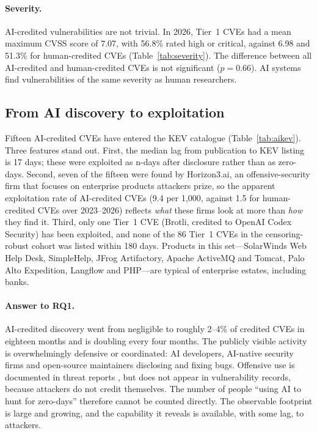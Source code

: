 \paragraph{Severity.} AI-credited vulnerabilities are not trivial. In 2026, Tier~1 CVEs had a mean maximum CVSS score of 7.07, with 56.8\% rated high or critical, against 6.98 and 51.3\% for human-credited CVEs (Table~\ref{tab:severity}). The difference between all AI-credited and human-credited CVEs is not significant ($p=0.66$). AI systems find vulnerabilities of the same severity as human researchers.

\subsection{From AI discovery to exploitation}
Fifteen AI-credited CVEs have entered the KEV catalogue (Table~\ref{tab:aikev}). Three features stand out. First, the median lag from publication to KEV listing is 17 days; these were exploited as n-days after disclosure rather than as zero-days. Second, seven of the fifteen were found by Horizon3.ai, an offensive-security firm that focuses on enterprise products attackers prize, so the apparent exploitation rate of AI-credited CVEs (9.4 per 1,000, against 1.5 for human-credited CVEs over 2023--2026) reflects \emph{what} these firms look at more than \emph{how} they find it. Third, only one Tier~1 CVE (Brotli, credited to OpenAI Codex Security) has been exploited, and none of the 86 Tier~1 CVEs in the censoring-robust cohort was listed within 180 days. Products in this set---SolarWinds Web Help Desk, SimpleHelp, JFrog Artifactory, Apache ActiveMQ and Tomcat, Palo Alto Expedition, Langflow and PHP---are typical of enterprise estates, including banks.

\begin{table}[!htbp]
\centering
\caption{AI-credited CVEs that entered the KEV catalogue.}
\label{tab:aikev}
\scriptsize
\resizebox{\textwidth}{!}{}
\end{table}

\paragraph{Answer to RQ1.} AI-credited discovery went from negligible to roughly 2--4\% of credited CVEs in eighteen months and is doubling every four months. The publicly visible activity is overwhelmingly defensive or coordinated: AI developers, AI-native security firms and open-source maintainers disclosing and fixing bugs. Offensive use is documented in threat reports \citep{microsoft2024threat,anthropic2025espionage}, but does not appear in vulnerability records, because attackers do not credit themselves. The number of people ``using AI to hunt for zero-days'' therefore cannot be counted directly. The observable footprint is large and growing, and the capability it reveals is available, with some lag, to attackers.

